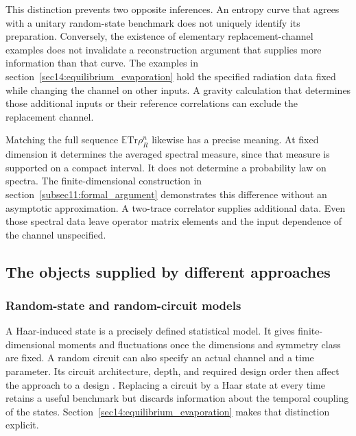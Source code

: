 \documentclass[11pt,letterpaper]{article}
\theoremstyle{plain}
\theoremstyle{definition}
\theoremstyle{remark}
\newcommand{\E}{\mathbb{E}}
\begin{document}
This distinction prevents two opposite inferences. An entropy curve
that agrees with a unitary random-state benchmark does not uniquely
identify its preparation. Conversely, the existence of elementary
replacement-channel examples does not invalidate a reconstruction
argument that supplies more information than that curve. The examples
in section~\ref{sec14:equilibrium_evaporation} hold the specified
radiation data fixed while changing the channel on other inputs. A
gravity calculation that determines those additional inputs or their
reference correlations can exclude the replacement channel.

Matching the full sequence $\E\mathrm{Tr}\rho_R^n$ likewise has a
precise meaning. At fixed dimension it determines the averaged spectral
measure, since that measure is supported on a compact interval. It
does not determine a probability law on spectra. The finite-dimensional
construction in section~\ref{subsec11:formal_argument} demonstrates
this difference without an asymptotic approximation. A two-trace
correlator supplies additional data. Even those spectral data leave
operator matrix elements and the input dependence of the channel
unspecified.

\subsection{The objects supplied by different approaches}
\label{subsec13:five_proposals}

\subsubsection{Random-state and random-circuit models}
\label{subsec13:random_unitary}
A Haar-induced state is a precisely defined statistical model. It gives
finite-dimensional moments and fluctuations once the dimensions and
symmetry class are fixed. A random circuit can also specify an actual
channel and a time parameter. Its circuit architecture, depth, and
required design order then affect the approach to a design
\cite{brandaoetal2016}.
Replacing a circuit by a Haar state at every time retains a useful
benchmark but discards information about the temporal coupling of the
states. Section~\ref{sec14:equilibrium_evaporation} makes that distinction
explicit.
\end{document}
